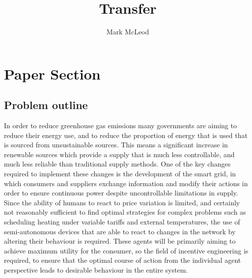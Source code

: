 \documentclass[a4paper, 10 pt, conference]{ieeeconf}  %
\title{\LARGE \bf Transfer}
\author{Mark McLeod}
\date{}
\begin{document}
\maketitle
\thispagestyle{empty}
\pagestyle{empty}

\section{Paper Section}
\subsection{Problem outline}

In order to reduce greenhouse gas emissions many governments are aiming to reduce their energy use, and to reduce the proportion of energy that is used that is sourced from unsustainable sources. This means a significant increase in renewable sources which provide a supply that is much less controllable, and much less reliable than traditional supply methods. One of the key changes required to implement these changes is the development of the smart grid, in which consumers and suppliers exchange information and modify their actions in order to ensure continuous power despite uncontrollable limitations in supply. Since the ability of humans to react to price variation is limited, and certainly not reasonably sufficient to find optimal strategies for complex problems such as scheduling heating under variable tariffs and external temperatures, the use of semi-autonomous devices that are able to react to changes in the network by altering their behaviour is required. These agents will be primarily aiming to achieve maximum utility for the consumer, so the field of incentive engineering is required, to ensure that the optimal course of action from the individual agent perspective leads to desirable behaviour in the entire system.
\end{document}

